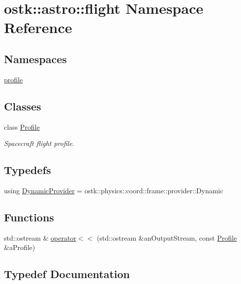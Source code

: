 \hypertarget{namespaceostk_1_1astro_1_1flight}{}\section{ostk\+:\+:astro\+:\+:flight Namespace Reference}
\label{namespaceostk_1_1astro_1_1flight}
\subsection*{Namespaces}
\begin{DoxyCompactItemize}
\item 
 \hyperlink{namespaceostk_1_1astro_1_1flight_1_1profile}{profile}
\end{DoxyCompactItemize}
\subsection*{Classes}
\begin{DoxyCompactItemize}
\item 
class \hyperlink{classostk_1_1astro_1_1flight_1_1_profile}{Profile}
\begin{DoxyCompactList}\small\item\em Spacecraft flight profile. \end{DoxyCompactList}\end{DoxyCompactItemize}
\subsection*{Typedefs}
\begin{DoxyCompactItemize}
\item 
using \hyperlink{namespaceostk_1_1astro_1_1flight_a30fb17f0f77e97e4d6bb5567218816bd}{Dynamic\+Provider} = ostk\+::physics\+::coord\+::frame\+::provider\+::\+Dynamic
\end{DoxyCompactItemize}
\subsection*{Functions}
\begin{DoxyCompactItemize}
\item 
std\+::ostream \& \hyperlink{namespaceostk_1_1astro_1_1flight_ad4a6bc77a55e55a29abdc5b4e3d8a346}{operator$<$$<$} (std\+::ostream \&an\+Output\+Stream, const \hyperlink{classostk_1_1astro_1_1flight_1_1_profile}{Profile} \&a\+Profile)
\end{DoxyCompactItemize}


\subsection{Typedef Documentation}
\mbox{\label{namespaceostk_1_1astro_1_1flight_a30fb17f0f77e97e4d6bb5567218816bd}} 
